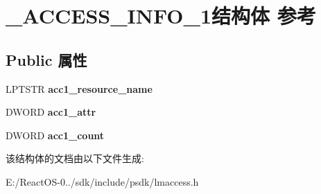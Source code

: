 \hypertarget{struct___a_c_c_e_s_s___i_n_f_o__1}{}\section{\+\_\+\+A\+C\+C\+E\+S\+S\+\_\+\+I\+N\+F\+O\+\_\+1结构体 参考}
\label{struct___a_c_c_e_s_s___i_n_f_o__1}
\subsection*{Public 属性}
\begin{DoxyCompactItemize}
\item 
\mbox{\label{struct___a_c_c_e_s_s___i_n_f_o__1_a61759d16e4e045f081b75e4d14f88489}} 
L\+P\+T\+S\+TR {\bfseries acc1\+\_\+resource\+\_\+name}
\item 
\mbox{\label{struct___a_c_c_e_s_s___i_n_f_o__1_a6113931224ad3295006b84f32ce2ca33}} 
D\+W\+O\+RD {\bfseries acc1\+\_\+attr}
\item 
\mbox{\label{struct___a_c_c_e_s_s___i_n_f_o__1_ad296625a9f44bc96780c85bae17e6adb}} 
D\+W\+O\+RD {\bfseries acc1\+\_\+count}
\end{DoxyCompactItemize}


该结构体的文档由以下文件生成\+:\begin{DoxyCompactItemize}
\item 
E\+:/\+React\+O\+S-\/0../sdk/include/psdk/lmaccess.\+h\end{DoxyCompactItemize}
